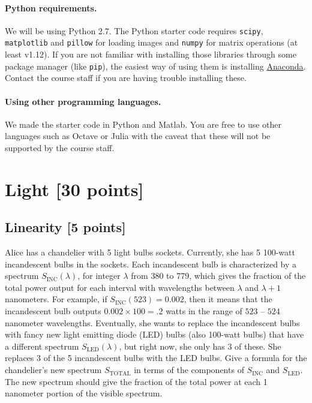 \documentclass[10pt,letterpaper]{article}
\newcommand{\cmd}[1] {{\color{blue}\texttt{#1}}}
\begin{document}
\paragraph{Python requirements.} We will be using Python 2.7. The Python starter code requires \cmd{scipy}, \cmd{matplotlib} and \cmd{pillow} for loading images and \cmd{numpy} for matrix operations (at least v1.12). 
If you are not familiar with installing those libraries through some package manager (like \cmd{pip}), the easiest way of using them is installing \href{https://conda.io/docs/user-guide/install/index.html}{Anaconda}. Contact the course staff if you are having trouble installing these.

\paragraph{Using other programming languages.} We made the starter code in Python and Matlab. You are free to use other languages such as Octave or Julia with the caveat that these will not be supported by the course staff.




\newpage
\section{Light [30 points]}
\subsection{Linearity [5 points]}
Alice has a chandelier with 5 light
bulbs sockets. Currently, she has 5 100-watt incandescent bulbs in the sockets.
Each incandescent bulb is characterized by a spectrum $S_{\text{INC}}(\lambda)$, for integer $\lambda$
from 380 to 779, which gives the fraction of the total power output for each
interval with wavelengths between $\lambda$ and $\lambda + 1$ nanometers. For example, if
$S_{\text{INC}}(523) = 0.002$, then it means that the incandescent bulb outputs $0.002 \times
100 = .2$ watts in the range of $523$ -- $524$ nanometer wavelengths.
Eventually, she wants to replace the incandescent bulbs with fancy new
light emitting diode (LED) bulbs (also 100-watt bulbs) that have a different
spectrum $S_{\text{LED}}(\lambda)$, but right now, she only has 3 of these. She replaces 3 of the 5
incandescent bulbs with the LED bulbs. Give a formula for the chandelier’s new
spectrum $S_{\text{TOTAL}}$ in terms of the components of $S_{\text{INC}}$ and $S_{\text{LED}}$. The new spectrum
should give the fraction of the total power at each 1 nanometer portion of the
visible spectrum.
\end{document}

